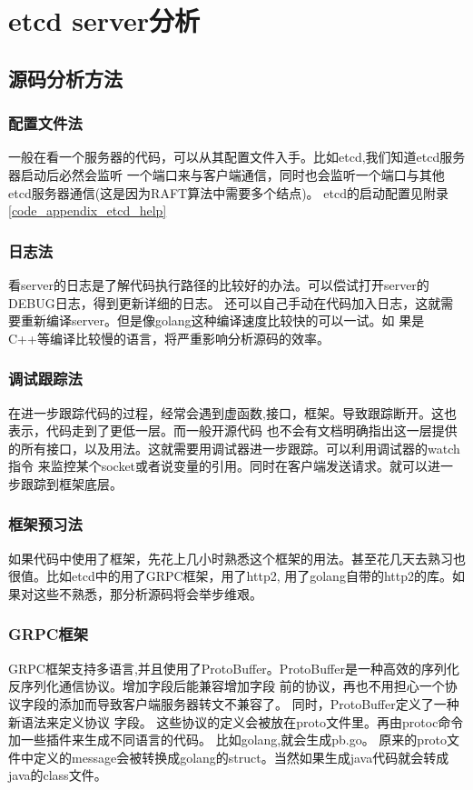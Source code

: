 
\mylineskip
\chapter{etcd server分析}
\section{源码分析方法}
\subsection{配置文件法}
一般在看一个服务器的代码，可以从其配置文件入手。比如etcd,我们知道etcd服务器启动后必然会监听
一个端口来与客户端通信，同时也会监听一个端口与其他etcd服务器通信(这是因为RAFT算法中需要多个结点)。
etcd的启动配置见附录\ref{code_appendix_etcd_help}

\subsection{日志法}
看server的日志是了解代码执行路径的比较好的办法。可以偿试打开server的DEBUG日志，得到更新详细的日志。
还可以自己手动在代码加入日志，这就需要重新编译server。但是像golang这种编译速度比较快的可以一试。如
果是C++等编译比较慢的语言，将严重影响分析源码的效率。

\subsection{调试跟踪法}
在进一步跟踪代码的过程，经常会遇到虚函数,接口，框架。导致跟踪断开。这也表示，代码走到了更低一层。而一般开源代码
也不会有文档明确指出这一层提供的所有接口，以及用法。这就需要用调试器进一步跟踪。可以利用调试器的watch指令
来监控某个socket或者说变量的引用。同时在客户端发送请求。就可以进一步跟踪到框架底层。

\subsection{框架预习法}
如果代码中使用了框架，先花上几小时熟悉这个框架的用法。甚至花几天去熟习也很值。比如etcd中的用了GRPC框架，用了http2,
用了golang自带的http2的库。如果对这些不熟悉，那分析源码将会举步维艰。

\subsection{GRPC框架}
GRPC框架支持多语言,并且使用了ProtoBuffer。ProtoBuffer是一种高效的序列化反序列化通信协议。增加字段后能兼容增加字段
前的协议，再也不用担心一个协议字段的添加而导致客户端服务器转文不兼容了。 同时，ProtoBuffer定义了一种新语法来定义协议
字段。 这些协议的定义会被放在proto文件里。再由protoc命令加一些插件来生成不同语言的代码。 比如golang,就会生成pb.go。
原来的proto文件中定义的message会被转换成golang的struct。当然如果生成java代码就会转成java的class文件。

